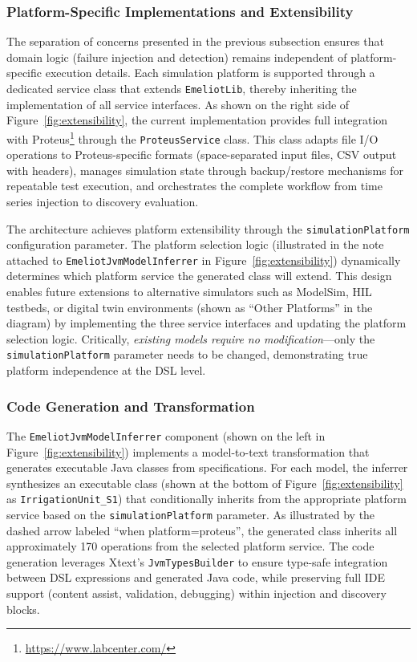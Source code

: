 \subsubsection{Platform-Specific Implementations and Extensibility}
The separation of concerns presented in the previous subsection ensures that domain logic (failure injection and detection) remains independent of platform-specific execution details. 
Each simulation platform is supported through a dedicated service class that extends \texttt{EmeliotLib}, thereby inheriting the implementation of all service interfaces. As shown on the right side of Figure~\ref{fig:extensibility}, the current implementation provides full integration with Proteus\footnote{\url{https://www.labcenter.com/}} through the \texttt{ProteusService} class. This class adapts file I/O operations to Proteus-specific formats (space-separated input files, CSV output with headers), manages simulation state through backup/restore mechanisms for repeatable test execution, and orchestrates the complete workflow from time series injection to discovery evaluation.

The architecture achieves platform extensibility through the \texttt{simulation\-Platform} configuration parameter. The platform selection logic (illustrated in the note attached to \texttt{EmeliotJvmModelInferrer} in Figure~\ref{fig:extensibility}) dynamically determines which platform service the generated class will extend. This design enables future extensions to alternative simulators such as ModelSim, HIL testbeds, or digital twin environments (shown as ``Other Platforms'' in the diagram) by implementing the three service interfaces and updating the platform selection logic. Critically, \textit{existing \tool models require no modification}—only the \texttt{simulationPlatform} parameter needs to be changed, demonstrating true platform independence at the DSL level.


\subsubsection{Code Generation and Transformation}
The \texttt{EmeliotJvmModelInferrer} component (shown on the left in Figure~\ref{fig:extensibility}) implements a model-to-text transformation that generates executable Java classes from \tool specifications. For each model, the inferrer synthesizes an executable class (shown at the bottom of Figure~\ref{fig:extensibility} as \texttt{IrrigationUnit\_S1}) that conditionally inherits from the appropriate platform service based on the \texttt{simulationPlatform} parameter. As illustrated by the dashed arrow labeled ``when platform=proteus'', the generated class inherits all approximately 170 operations from the selected platform service. The code generation leverages Xtext's \texttt{JvmTypesBuilder} to ensure type-safe integration between DSL expressions and generated Java code, while preserving full IDE support (content assist, validation, debugging) within injection and discovery blocks.



